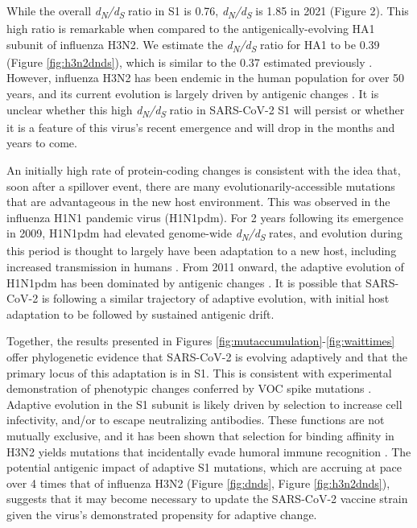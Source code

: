 \documentclass[11pt,oneside,letterpaper]{article}
\begin{document}
 While the overall \emph{d\textsubscript{N}/d\textsubscript{S}} ratio in S1 is 0.76, \emph{d\textsubscript{N}/d\textsubscript{S}} is 1.85 in 2021 (Figure 2).
 This high ratio is remarkable when compared to the antigenically-evolving HA1 subunit of influenza H3N2. We estimate the \emph{d\textsubscript{N}/d\textsubscript{S}} ratio for HA1 to be 0.39 (Figure \ref{fig:h3n2dnds}), which is similar to the 0.37 estimated previously \cite{Wolf2006-vy}.
 However, influenza H3N2 has been endemic in the human population for over 50 years, and its current evolution is largely driven by antigenic changes \cite{Smith2004-if}.
 It is unclear whether this high \emph{d\textsubscript{N}/d\textsubscript{S}} ratio in SARS-CoV-2 S1 will persist or whether it is a feature of this virus's recent emergence and will drop in the months and years to come.

An initially high rate of protein-coding changes is consistent with the idea that, soon after a spillover event, there are many evolutionarily-accessible mutations that are advantageous in the new host environment.
This was observed in the influenza H1N1 pandemic virus (H1N1pdm).
For 2 years following its emergence in 2009, H1N1pdm had elevated genome-wide \emph{d\textsubscript{N}/d\textsubscript{S}} rates, and evolution during this period is thought to largely have been adaptation to a new host, including increased transmission in humans \cite{Su2015-az}.
From 2011 onward, the adaptive evolution of H1N1pdm has been dominated by antigenic changes \cite{Su2015-az}.
It is possible that SARS-CoV-2 is following a similar trajectory of adaptive evolution, with initial host adaptation to be followed by sustained antigenic drift.

Together, the results presented in Figures \ref{fig:mutaccumulation}-\ref{fig:waittimes} offer phylogenetic evidence that SARS-CoV-2 is evolving adaptively and that the primary locus of this adaptation is in S1.
This is consistent with experimental demonstration of phenotypic changes conferred by VOC spike mutations \cite{Wang2021-dm, Greaney2021-jn, Li2020-jd, Liu2021-ne}.
Adaptive evolution in the S1 subunit is likely driven by selection to increase cell infectivity, and/or to escape neutralizing antibodies.
These functions are not mutually exclusive, and it has been shown that selection for binding affinity in H3N2 yields mutations that incidentally evade humoral immune recognition \cite{Hensley2009-at}.
The potential antigenic impact of adaptive S1 mutations, which are accruing at pace over 4 times that of influenza H3N2 (Figure \ref{fig:dnds}, Figure \ref{fig:h3n2dnds}), suggests that it may become necessary to update the SARS-CoV-2 vaccine strain given the virus's demonstrated propensity for adaptive change.
\end{document}
